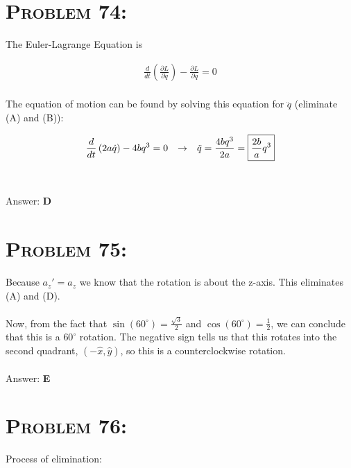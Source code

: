 \documentclass{article}
\begin{document}
\section{\textsc{Problem 74:}} The Euler-Lagrange Equation is

\begin{gather}
\frac{d}{dt} \left(  \frac{\partial L}{\partial \dot{q}} \right) - \frac{\partial L}{\partial q} = 0
\end{gather}
\\
The equation of motion can be found by solving this equation for $\ddot{q}$ (eliminate (A) and (B)):

\begin{align}
\frac{d}{dt} \left(  2 a \dot{q}   \right) - 4 b q^{3} = 0   %
\hspace{.1in} \rightarrow \hspace{.1in}
 \ddot{q} =\frac{ 4 b q^{3}}{2 a} = \boxed{\frac{2 b}{a} q^{3}} \nonumber
\end{align}
\\\\
Answer: \textbf{\textcolor{ProcessBlue}D}\\


\section{\textsc{Problem 75:}} Because $a_{z}' = a_{z}$ we know that the rotation is about the z-axis. This eliminates (A) and (D). \\
\\
Now, from the fact that $\sin{(60^{\circ})} = \frac{\sqrt{3}}{2}$ and $\cos{(60^{\circ})} = \frac{1}{2}$,  we can conclude that this is a $60^{\circ}$ rotation. The negative sign tells us that this rotates into the second quadrant, $(-\hat{x}, \hat{y})$, so this is a counterclockwise rotation.
\\\\
Answer: \textbf{\textcolor{ProcessBlue}E}\\


\section{\textsc{Problem 76:}} Process of elimination:
\end{document}
